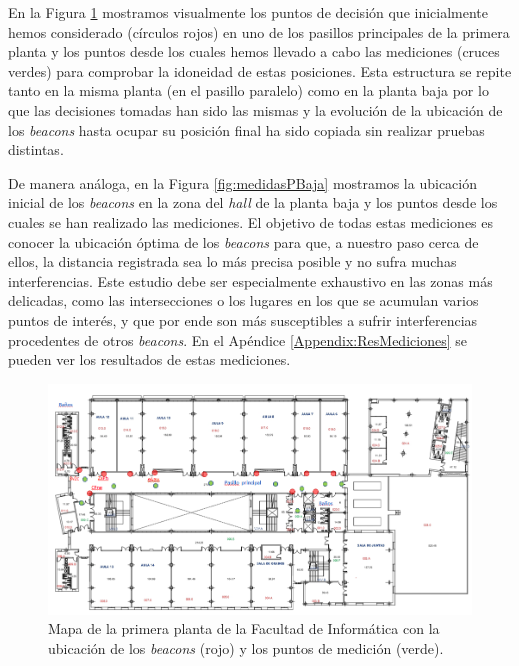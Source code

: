 En la Figura \ref{fig:medidasPPrimera} mostramos visualmente los puntos de decisión que inicialmente hemos considerado (círculos rojos) en uno de los pasillos principales de la primera planta y los puntos desde los cuales hemos llevado a cabo las mediciones (cruces verdes) para comprobar la idoneidad de estas posiciones. Esta estructura se repite tanto en la misma planta (en el pasillo paralelo) como en la planta baja por lo que las decisiones tomadas han sido las mismas y la evolución de la ubicación de los \textit{beacons} hasta ocupar su posición final ha sido copiada sin realizar pruebas distintas.

De manera análoga, en la Figura \ref{fig:medidasPBaja} mostramos la ubicación inicial de los \textit{beacons} en la zona del \textit{hall} de la planta baja y los puntos desde los cuales se han realizado las mediciones. El objetivo de todas estas mediciones es conocer la ubicación óptima de los \textit{beacons} para que, a nuestro paso cerca de ellos, la distancia registrada sea lo más precisa posible y no sufra muchas interferencias. Este estudio debe ser especialmente exhaustivo en las zonas más delicadas, como las intersecciones o los lugares en los que se acumulan varios puntos de interés, y que por ende son más susceptibles a sufrir interferencias procedentes de otros \textit{beacons}. En el Apéndice \ref{Appendix:ResMediciones} se pueden ver los resultados de estas mediciones. 


\begin{figure}[t]
	\centering
	\includegraphics[width=1\textwidth]{Imagenes/Descripciondeltrabajo/mapa_mediciones_planta1}
	\caption{Mapa de la primera planta de la Facultad de Informática con la ubicación de los \textit{beacons} (rojo) y los puntos de medición (verde). }
	\label{fig:medidasPPrimera}
\end{figure}

